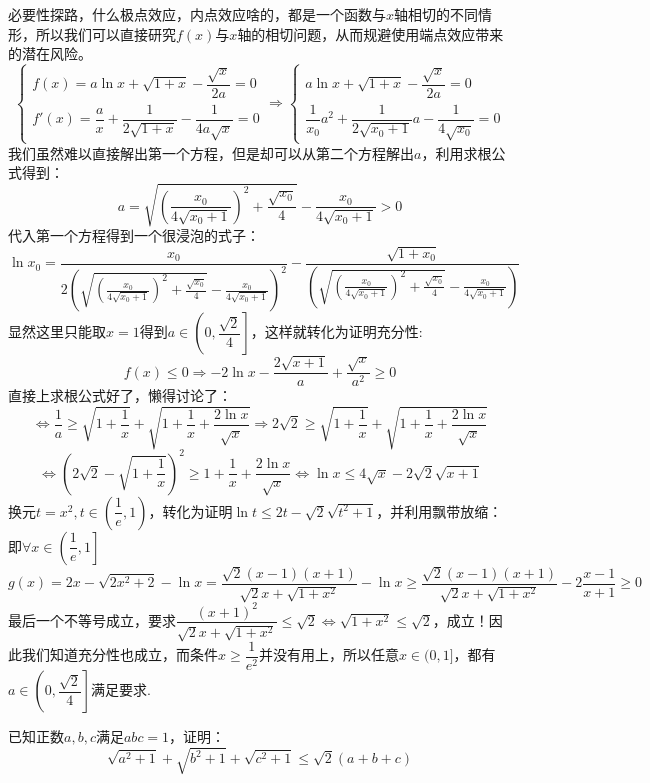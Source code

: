 \begin{solution}
    必要性探路，什么极点效应，内点效应啥的，都是一个函数与$x$轴相切的不同情形，所以我们可以直接研究$f(x)$与$x$轴的相切问题，从而规避使用端点效应带来的潜在风险。
    \[\begin{cases}f(x)=a\ln x+\sqrt{1+x}-\dfrac{\sqrt{x}}{2a}=0\\[1.2ex]f'(x)=\dfrac{a}{x}+\dfrac{1}{2\sqrt{1+x}}-\dfrac{1}{4a\sqrt{x}}=0\end{cases}
    \Rightarrow \begin{cases}a\ln x+\sqrt{1+x}-\dfrac{\sqrt{x}}{2a}=0\\[1.2ex]\dfrac{1}{x_0}a^2+\dfrac{1}{2\sqrt{x_0+1}}a-\dfrac{1}{4\sqrt{x_0}}=0\end{cases}\]
    我们虽然难以直接解出第一个方程，但是却可以从第二个方程解出$a$，利用求根公式得到：
    \[a=\sqrt{\left(\frac{x_0}{4\sqrt{x_0+1}}\right)^2+\dfrac{\sqrt{x_0}}{4}}-\frac{x_0}{4\sqrt{x_0+1}}>0\]
    代入第一个方程得到一个很浸泡的式子：\[\ln x_0=\frac{x_0}{2\left(\sqrt{\left(\frac{x_0}{4\sqrt{x_0+1}}\right)^2+\frac{\sqrt{x_0}}{4}}-\frac{x_0}{4\sqrt{x_0+1}}\right)^2}-\dfrac{\sqrt{1+x_0}}{\left(\sqrt{\left(\frac{x_0}{4\sqrt{x_0+1}}\right)^2+\frac{\sqrt{x_0}}{4}}-\frac{x_0}{4\sqrt{x_0+1}}\right)}\]
    显然这里只能取$x=1$得到$a\in\left(0,\dfrac{\sqrt{2}}{4}\right]$，这样就转化为证明充分性:\[f(x)\leq0\Rightarrow-2\ln x-\frac{2\sqrt{x+1}}{a}+\frac{\sqrt{x}}{a^2}\geq0\]
    直接上求根公式好了，懒得讨论了：\[\Leftrightarrow \dfrac{1}{a}\geq\sqrt{1+\frac{1}{x}}+\sqrt{1+\frac{1}{x}+\frac{2\ln x}{\sqrt x}}\Rightarrow 2\sqrt2\geq\sqrt{1+\frac{1}{x}}+\sqrt{1+\frac{1}{x}+\frac{2\ln x}{\sqrt x}}\]
    \[\Leftrightarrow\left(2\sqrt{2}-\sqrt{1+\frac{1}{x}}\right)^{2}\geq1+\frac{1}{x}+\frac{2\ln x}{\sqrt{x}}\Leftrightarrow \ln x\leq4\sqrt{x}-2\sqrt{2}\sqrt{x+1}\]
    换元$t=x^2,t\in\left(\dfrac{1}{e},1\right)$，转化为证明$\ln t\leq 2t-\sqrt2\sqrt{t^2+1}$，并利用飘带放缩：即$\forall x\in\left(\dfrac{1}{e},1\right]$
    \[g(x)=2x-\sqrt{2x^2+2}-\ln x=\dfrac{\sqrt2(x-1)(x+1)}{\sqrt{2}x+\sqrt{1+x^2}}-\ln x\geq \dfrac{\sqrt2(x-1)(x+1)}{\sqrt{2}x+\sqrt{1+x^2}}-2\dfrac{x-1}{x+1}\geq 0\]
    最后一个不等号成立，要求$\dfrac{(x+1)^2}{\sqrt{2}x+\sqrt{1+x^2}}\leq \sqrt2\Leftrightarrow \sqrt{1+x^2}\leq \sqrt{2}$，成立！因此我们知道充分性也成立，而条件$x\geq \dfrac{1}{e^2}$并没有用上，所以任意$x\in(0,1]$，都有$a\in\left(0,\dfrac{\sqrt{2}}{4}\right]$满足要求.
\end{solution}
\begin{example}{}{}
    已知正数$a,b,c$满足$abc=1$，证明：\[\sqrt{a^2+1}+\sqrt{b^2+1}+\sqrt{c^2+1}\leqslant\sqrt{2}\left(a+b+c\right)\]
\end{example}
